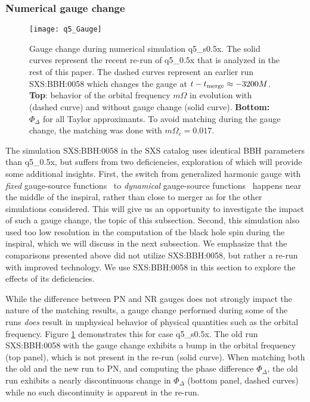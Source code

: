 \documentclass[aps,prd,amsmath,floatfix,twocolumn,superscriptaddress,nofootinbib,showpacs]{revtex4-1}
\begin{document}
\subsubsection{Numerical gauge change}
\label{sec:Gauge}


\begin{figure}
  \centering
    \texttt{[image: q5\_Gauge]}
    \caption{Gauge change during numerical simulation q5\_s0.5x.  The
      solid curves represent the recent re-run of q5\_0.5x that is
      analyzed in the rest of this paper.  The dashed curves represent
      an earlier run SXS:BBH:0058 which changes the gauge at $t-t_{\rm
        merge}\approx -3200M$.  {\bf Top}: behavior of the orbital
      frequency $m\Omega$ in evolution with (dashed curve) and without
      gauge change (solid curve). {\bf Bottom:} $\Phi_{\Delta}$ for
      all Taylor approximants. To avoid matching during the gauge
      change, the matching was done with $m\Omega_{c}=0.017$. }
  \label{fig:gaugeProblems}
\end{figure}

The simulation SXS:BBH:0058 in the SXS catalog uses identical BBH
parameters than q5\_0.5x, but suffers from two deficiencies,
exploration of which will provide some additional insights.  First,
the switch from generalized harmonic gauge with \emph{fixed}
gauge-source functions~\cite{Boyle2007} to \emph{dynamical}
gauge-source functions~\cite{Lindblom2009c,Szilagyi:2009qz} happens
near the middle of the inspiral, rather than close to merger as for
the other simulations considered. This will give us an opportunity to
investigate the impact of such a gauge change, the topic of this
subsection.  Second, this simulation also used too low resolution in
the computation of the black hole spin during the inspiral, which we
will discuss in the next subsection.  We emphasize that the
comparisons presented above did not utilize SXS:BBH:0058, but rather a
re-run with improved technology.  We use SXS:BBH:0058 in this section
to explore the effects of its deficiencies.

While the difference between PN and NR gauges does not strongly impact
the nature of the matching results, a gauge change performed during
some of the runs \emph{does} result in unphysical behavior of physical
quantities such as the orbital frequency. Figure
\ref{fig:gaugeProblems} demonstrates this for case q5\_s0.5x.  The old
run SXS:BBH:0058 with the gauge change exhibits a bump in the orbital
frequency (top panel), which is not present in the re-run (solid
curve).  When matching both the old and the new run to PN, and
computing the phase difference $\Phi_\Delta$, the old run exhibits a
nearly discontinuous change in $\Phi_{\Delta}$ (bottom panel, dashed
curves) while no such discontinuity is apparent in the re-run.
\end{document}
